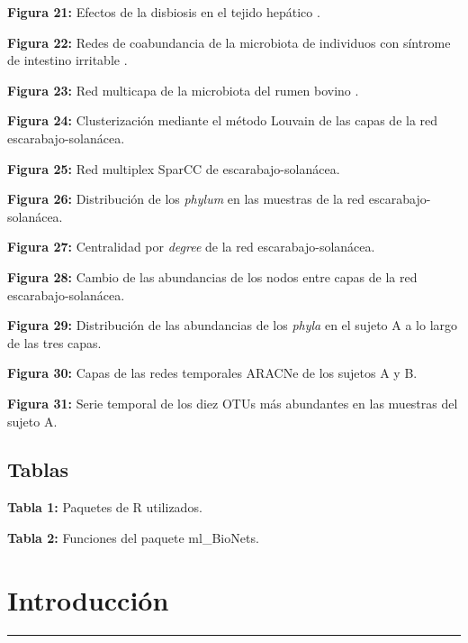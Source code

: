 \documentclass[
]{book}
\begin{document}
\textbf{Figura 21:} Efectos de la disbiosis en el tejido hepático \citep{del2017gut}.

\textbf{Figura 22:} Redes de coabundancia de la microbiota de individuos con síntrome de intestino irritable \citep{smith2013gut}.

\textbf{Figura 23:} Red multicapa de la microbiota del rumen bovino \citep{zheng2018improving}.

\textbf{Figura 24:} Clusterización mediante el método Louvain de las capas de la red escarabajo-solanácea.

\textbf{Figura 25:} Red multiplex SparCC de escarabajo-solanácea.

\textbf{Figura 26:} Distribución de los \emph{phylum} en las muestras de la red escarabajo-solanácea.

\textbf{Figura 27:} Centralidad por \emph{degree} de la red escarabajo-solanácea.

\textbf{Figura 28:} Cambio de las abundancias de los nodos entre capas de la red escarabajo-solanácea.

\textbf{Figura 29:} Distribución de las abundancias de los \emph{phyla} en el sujeto A a lo largo de las tres capas.

\textbf{Figura 30:} Capas de las redes temporales ARACNe de los sujetos A y B.

\textbf{Figura 31:} Serie temporal de los diez OTUs más abundantes en las muestras del sujeto A.

\hypertarget{tablas}{%
\section*{Tablas}\label{tablas}}

\textbf{Tabla 1:} Paquetes de R utilizados.

\textbf{Tabla 2:} Funciones del paquete ml\_BioNets.

\hypertarget{introducciuxf3n}{%
\chapter*{Introducción}\label{introducciuxf3n}}

\begin{center}\rule{0.5\linewidth}{0.5pt}\end{center}
\end{document}
